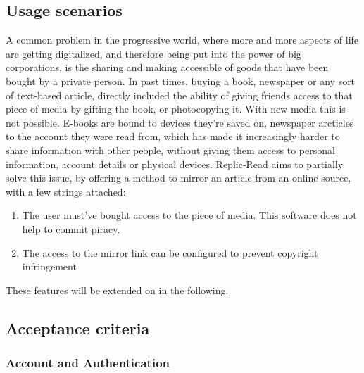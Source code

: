 \subsection{Usage scenarios}\label{subsec:usage-scenarios}
A common problem in the progressive world, where more and more aspects of life are getting digitalized, and therefore being put into the power of big corporations, is the sharing and making accessible of goods that have been bought by a private person.
In past times, buying a book, newspaper or any sort of text-based article, directly included the ability of giving friends access to that piece of media by gifting the book, or photocopying it.
\newline
With new media this is not possible.
E-books are bound to devices they're saved on, newspaper arcticles to the account they were read from, which has made it increasingly harder to share information with other people, without giving them access to personal information, account details or physical devices.
Replic-Read aims to partially solve this issue, by offering a method to mirror an article from an online source, with a few strings attached:
\begin{enumerate}
    \item The user must've bought access to the piece of media.
    This software does not help to commit piracy.
    \item The access to the mirror link can be configured to prevent copyright infringement
\end{enumerate}
These features will be extended on in the following.

\subsection{Acceptance criteria}\label{subsec:acceptance-criteria}

\subsubsection{Account and Authentication}

